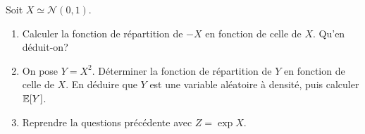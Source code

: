 \begin{td-exo}[] %
    Soit \(X\simeq\mathcal N(0,1)\).
    \begin{enumerate}
        \item Calculer la fonction de répartition de \(-X\) en
        fonction de celle de \(X\). Qu'en déduit-on?

        \item On pose \(Y = X^2\). Déterminer la fonction de répartition
        de \(Y\) en fonction de celle de \(X\). En déduire que \(Y\)
        est une variable aléatoire à densité, puis calculer \(\mathbb{E}\mathopen{}\left[Y\right]\mathclose{}\).

        \item Reprendre la questions précédente avec \(Z = \exp X\).
    \end{enumerate}
\end{td-exo}
